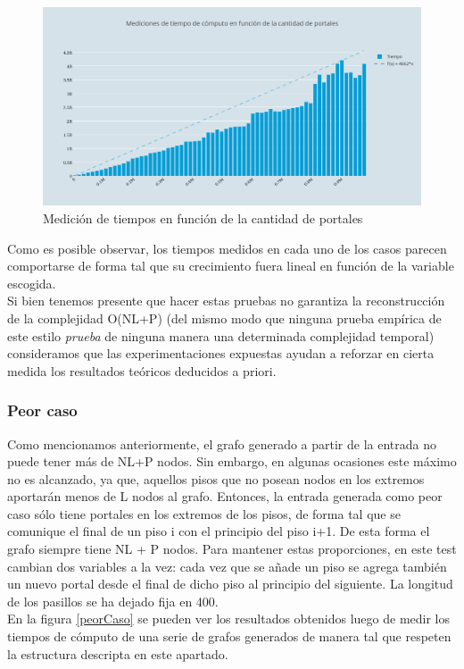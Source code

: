 \begin{figure}[H]
   \begin{center}
 	\includegraphics[width=18cm]{imagenes/ej2/f(portales).png}
	\caption{Medición de tiempos en función de la cantidad de portales}
	\label{portales}
   \end{center}
 \end{figure}


Como es posible observar, los tiempos medidos en cada uno de los casos parecen comportarse de forma tal que su crecimiento fuera lineal en función de la variable escogida.\\

Si bien tenemos presente que hacer estas pruebas no garantiza la reconstrucción de la complejidad O(NL+P) (del mismo modo que ninguna prueba empírica de este estilo \textit{prueba} de ninguna manera una determinada complejidad temporal) consideramos que las experimentaciones expuestas ayudan a reforzar en cierta medida los resultados teóricos deducidos a priori. \\


\subsubsection{Peor caso}
Como mencionamos anteriormente, el grafo generado a partir de la entrada no puede tener más de NL+P nodos. Sin embargo, en algunas ocasiones este máximo no es alcanzado, ya que, aquellos pisos que no posean nodos en los extremos aportarán menos de L nodos al grafo. Entonces, la entrada generada como peor caso sólo tiene portales en los extremos de los pisos, de forma tal que se comunique el final de un piso i con el principio del piso i+1. De esta forma el grafo siempre tiene NL + P nodos. Para mantener estas proporciones, en este test cambian dos variables a la vez: cada vez que se añade un piso se agrega también un nuevo portal desde el final de dicho piso al principio del siguiente. La longitud de los pasillos se ha dejado fija en 400.\\
En la figura \ref{peorCaso} se pueden ver los resultados obtenidos luego de medir los tiempos de cómputo de una serie de grafos generados de manera tal que respeten la estructura descripta en este apartado.

